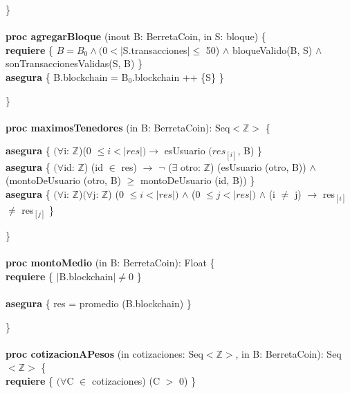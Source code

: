 \documentclass{article}
\newcommand{\Entero}{$\mathds{Z}$}
\begin{document}
    \}\\\\

    \textbf{proc agregarBloque} (inout B: BerretaCoin, in S: bloque) \{\\
        \indent\indent\textbf{requiere} \{ $B = B_0 \land (0 < |$S.transacciones$| \leq$ 50) $\land$ bloqueValido(B, S) $\land$ sonTransaccionesValidas(S, B) \}\\

        \indent\indent\textbf{asegura} \{ B.blockchain = B${_0}$.blockchain ++ \{S\} \}

    \}\\\\

    \textbf{proc maximosTenedores} (in B: BerretaCoin): Seq$<$\Entero$>$ \{

        \indent\indent\textbf{asegura} \{ $(\forall$i: \Entero)(0 $\le i < |res|) \rightarrow$
                                            esUsuario $(res_{[i]}$, B) \}\\

        \indent\indent\textbf{asegura} \{ $(\forall$id: \Entero) (id $\in$ res) $\rightarrow$
                                         $\neg$ ($\exists$ otro: \Entero) (esUsuario (otro, B)) $\land$\\
        \indent\indent\indent\indent\indent (montoDeUsuario (otro, B) $\ge$ montoDeUsuario (id, B)) \}\\

        \indent\indent\textbf{asegura} \{ $(\forall$i: \Entero)$(\forall$j: \Entero) (0 $\le i < |res|)$ $\land$ (0 $\le j < |res|)$ $\land$ (i $\ne$ j) $\rightarrow$ res$_{[i]}$ $\ne$ res$_{[j]}$ \}

    \}\\\\

    \textbf{proc montoMedio} (in B: BerretaCoin): Float \{\\
        \indent\indent \textbf{requiere} \{ $|$B.blockchain$| \ne 0$ \}\\\\
        \indent\indent \textbf{asegura} \{ res = promedio (B.blockchain) \}

    \}\\\\

    \textbf{proc cotizacionAPesos} (in cotizaciones: Seq$<$\Entero$>$, in B: BerretaCoin): Seq$<$\Entero$>$ \{\\
        \indent\indent \textbf{requiere} \{ $(\forall$C $\in$ cotizaciones) (C $>$ 0) \}\\
\end{document}
